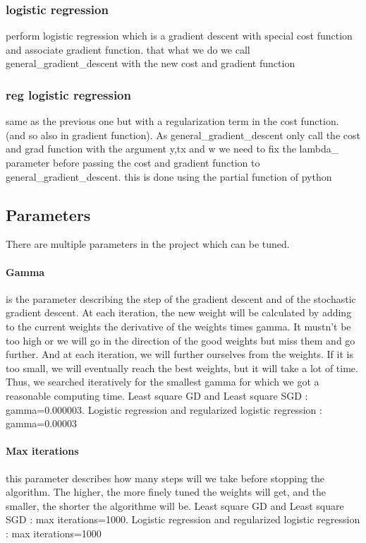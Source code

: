\documentclass[10pt,conference,compsocconf]{IEEEtran}
\begin{document}
\subsubsection{logistic regression}

perform logistic regression which is a gradient descent with special cost function and associate gradient function. that what we do we call general\_gradient\_descent with the new cost and gradient function 

\subsubsection{reg logistic regression}
same as the previous one but with a regularization term in the cost function. (and so also in gradient function). As general\_gradient\_descent only call the cost and grad function with the argument y,tx and w we need to fix the lambda\_ parameter before passing the cost and gradient function to general\_gradient\_descent. this is done using the partial function of python

\subsection{Parameters}
There are multiple parameters in the project which can be tuned. 
\paragraph{Gamma} is the parameter describing the step of the gradient descent and of the stochastic gradient descent. At each iteration, the new weight will be calculated by adding to the current weights the derivative of the weights times gamma. It mustn’t be too high or we will go in the direction of the good weights but miss them and go further. And at each iteration, we will further ourselves from the weights. If it is too small, we will eventually reach the best weights, but it will take a lot of time. Thus, we searched iteratively for the smallest gamma for which we got a reasonable computing time.
Least square GD and Least square SGD : gamma=0.000003.
Logistic regression and regularized logistic regression : gamma=0.00003
\paragraph{Max iterations} this parameter describes how many steps will we take before stopping the algorithm. The higher, the more finely tuned the weights will get, and the smaller, the shorter the algorithme will be. 
Least square GD and Least square SGD : max iterations=1000.
Logistic regression and regularized logistic regression :  max iterations=1000
\end{document}
